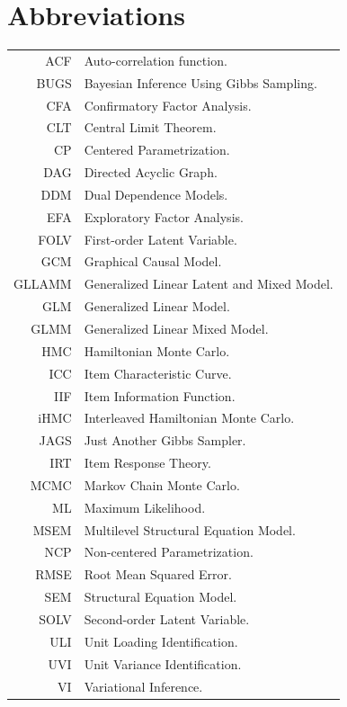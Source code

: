 \documentclass[12pt,a4paper,oneside]{book}
\begin{document}
\chapter*{Abbreviations}

\begin{tabular}{rl}
	ACF		& Auto-correlation function.\\
	BUGS	& Bayesian Inference Using Gibbs Sampling.\\
	CFA		& Confirmatory Factor Analysis. \\
	CLT		& Central Limit Theorem. \\
	CP		& Centered Parametrization.\\
	DAG		& Directed Acyclic Graph.\\
	DDM		& Dual Dependence Models.\\
	EFA		& Exploratory Factor Analysis. \\
	FOLV	& First-order Latent Variable. \\
	GCM		& Graphical Causal Model.\\
	GLLAMM	& Generalized Linear Latent and Mixed Model. \\
	GLM		& Generalized Linear Model. \\
	GLMM	& Generalized Linear Mixed Model. \\
	HMC		& Hamiltonian Monte Carlo.\\
	ICC		& Item Characteristic Curve.\\
	IIF		& Item Information Function.\\
	iHMC	& Interleaved Hamiltonian Monte Carlo.\\
	JAGS	& Just Another Gibbs Sampler.\\
	IRT		& Item Response Theory. \\
	MCMC	& Markov Chain Monte Carlo.\\
	ML		& Maximum Likelihood.\\
	MSEM	& Multilevel Structural Equation Model.\\
	NCP		& Non-centered Parametrization.\\
	RMSE	& Root Mean Squared Error.\\
	SEM		& Structural Equation Model. \\
	SOLV	& Second-order Latent Variable.\\
	ULI		& Unit Loading Identification.\\
	UVI		& Unit Variance Identification.\\
	VI		& Variational Inference.
	
\end{tabular}
\end{document}
